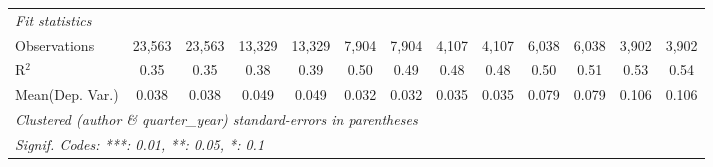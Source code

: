 \begin{tabular}{lcccccccccccc}
   \midrule
   \emph{Fit statistics}\\
   Observations                             & 23,563        & 23,563         & 13,329        & 13,329         & 7,904         & 7,904    & 4,107         & 4,107    & 6,038         & 6,038          & 3,902         & 3,902\\  
   R$^2$                                    & 0.35          & 0.35           & 0.38          & 0.39           & 0.50          & 0.49     & 0.48          & 0.48     & 0.50          & 0.51           & 0.53          & 0.54\\  
Mean(Dep. Var.) & 0.038 & 0.038 & 0.049 & 0.049 & 0.032 & 0.032 & 0.035 & 0.035 & 0.079 & 0.079 & 0.106 & 0.106 \\
   \midrule \midrule
   \multicolumn{13}{l}{\emph{Clustered (author \& quarter\_year) standard-errors in parentheses}}\\
   \multicolumn{13}{l}{\emph{Signif. Codes: ***: 0.01, **: 0.05, *: 0.1}}\\
\end{tabular}
\par\endgroup
